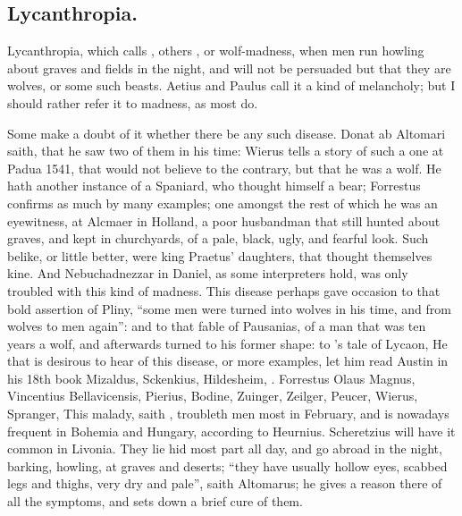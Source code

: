 \clearpage{}

\subsection{Lycanthropia.}

Lycanthropia, which \Avicenna{} calls , others ,
or wolf-madness, when men run howling about graves and fields in the night, and
will not be persuaded but that they are wolves, or some such beasts.
Aetius and Paulus call it a kind of
melancholy; but I should rather refer it to madness, as most do.

Some make a doubt of it whether there be any such disease.
Donat ab Altomari saith, that he saw two of them in his
time: Wierus tells a story of such a one at Padua 1541,
that would not believe to the contrary, but that he was a wolf. He hath another
instance of a Spaniard, who thought himself a bear;
Forrestus confirms as much by many examples; one amongst
the rest of which he was an eyewitness, at Alcmaer in Holland, a poor
husbandman that still hunted about graves, and kept in churchyards, of a pale,
black, ugly, and fearful look. Such belike, or little better, were king
Praetus' daughters, that thought themselves kine. And
Nebuchadnezzar in Daniel, as some interpreters hold, was only troubled with
this kind of madness. This disease perhaps gave occasion to that bold assertion
of Pliny, \enquote{some men were turned into wolves in his time,
and from wolves to men again}: and to that fable of Pausanias, of a man that
was ten years a wolf, and afterwards turned to his former shape: to
\Ovid{}'s tale of Lycaon, \etc{} He that is desirous to hear
of this disease, or more examples, let him read Austin in his 18th book
 Mizaldus,
 Sckenkius, 
Hildesheim, . Forrestus
 Olaus Magnus, Vincentius
Bellavicensis,  Pierius,
Bodine, Zuinger, Zeilger, Peucer, Wierus, Spranger, \etc{} This malady, saith
\Avicenna{}, troubleth men most in February, and is nowadays frequent in Bohemia
and Hungary, according to Heurnius. Scheretzius will have
it common in Livonia. They lie hid most part all day, and go abroad in the
night, barking, howling, at graves and deserts; \enquote{they have
usually hollow eyes, scabbed legs and thighs, very dry and pale},
saith Altomarus; he gives a reason there of all the
symptoms, and sets down a brief cure of them.

